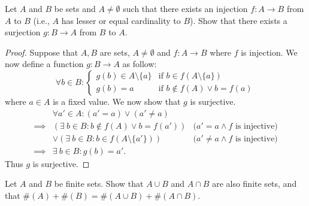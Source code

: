 \begin{ex}\label{ex:3.6.8}
  Let \(A\) and \(B\) be sets and \(A \neq \emptyset\) such that there exists an injection \(f : A \to B\) from \(A\) to \(B\) (i.e., \(A\) has lesser or equal cardinality to \(B\)).
  Show that there exists a surjection \(g : B \to A\) from \(B\) to \(A\).
\end{ex}

\begin{proof}
  Suppose that \(A, B\) are sets, \(A \neq \emptyset\) and \(f : A \to B\) where \(f\) is injection.
  We now define a function \(g : B \to A\) as follow:
  \[
    \forall b \in B : \begin{cases}
      g(b) \in A \setminus \{a\} & \text{if } b \in f(A \setminus \{a\})  \\
      g(b) = a                   & \text{if } b \notin f(A) \lor b = f(a)
    \end{cases}
  \]
  where \(a \in A\) is a fixed value.
  We now show that \(g\) is surjective.
  \begin{align*}
             & \forall a' \in A : (a' = a) \lor (a' \neq a)                                                        \\
    \implies & (\exists\ b \in B : b \notin f(A) \lor b = f(a'))     & \text{(\(a' = a \land f\) is injective)}    \\
             & \lor (\exists\ b \in B : b \in f(A \setminus \{a'\})) & \text{(\(a' \neq a \land f\) is injective)} \\
    \implies & \exists\ b \in B : g(b) = a'.
  \end{align*}
  Thus \(g\) is surjective.
\end{proof}

\begin{ex}\label{ex:3.6.9}
  Let \(A\) and \(B\) be finite sets.
  Show that \(A \cup B\) and \(A \cap B\) are also finite sets, and that \(\#(A) + \#(B) = \#(A \cup B) + \#(A \cap B)\).
\end{ex}

